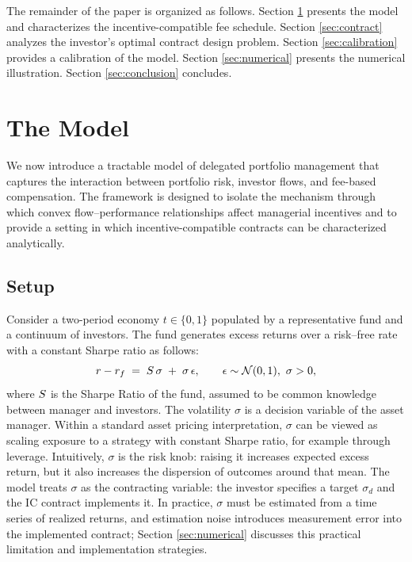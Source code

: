 The remainder of the paper is organized as follows. Section
\ref{sec:environment} presents the model and characterizes the
incentive-compatible fee schedule. Section \ref{sec:contract} analyzes
the investor's optimal contract design problem. Section
\ref{sec:calibration} provides a calibration of the model. Section
\ref{sec:numerical} presents the numerical illustration. Section
\ref{sec:conclusion} concludes.

\section{The Model}\label{sec:environment}

We now introduce a tractable model of delegated portfolio management
that captures the interaction between portfolio risk, investor flows,
and fee-based compensation. The framework is designed to isolate the
mechanism through which convex flow--performance relationships affect
managerial incentives and to provide a setting in which
incentive-compatible contracts can be characterized analytically.

\subsection{Setup}\label{setup}

Consider a two-period economy \(t\in\{0,1\}\) populated by a
representative fund and a continuum of investors. The fund generates
excess returns over a risk--free rate with a constant Sharpe ratio as
follows: \begin{equation}
    r-r_f \;=\; S\,\sigma \;+\; \sigma\,\epsilon,
    \qquad \epsilon \sim \mathcal{N}(0,1),\ \sigma>0,
\end{equation} where \(S\) is the Sharpe Ratio of the fund,
assumed to be common knowledge between manager and investors. The
volatility \(\sigma\) is a decision variable of the asset manager.
Within a standard asset pricing interpretation, \(\sigma\) can be viewed
as scaling exposure to a strategy with constant Sharpe ratio, for
example through leverage. Intuitively, \(\sigma\) is the risk knob:
raising it increases expected excess return, but it also increases the
dispersion of outcomes around that mean. The model treats \(\sigma\) as
the contracting variable: the investor specifies a target \(\sigma_d\)
and the IC contract implements it. In practice, \(\sigma\) must be
estimated from a time series of realized returns, and estimation noise
introduces measurement error into the implemented contract; Section
\ref{sec:numerical} discusses this practical limitation and
implementation strategies.


